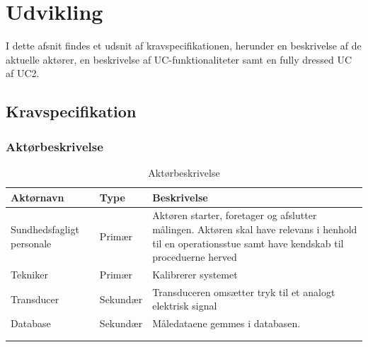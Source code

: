 \chapter{Udvikling}\label{kapitel_Udvikling}

I dette afsnit findes et udsnit af kravspecifikationen, herunder en beskrivelse af de aktuelle aktører, en beskrivelse af UC-funktionaliteter samt en fully dressed UC af UC2.

\section{Kravspecifikation}


\subsection{Aktørbeskrivelse}
\begin{longtabu} to 
    \textbf{Aktørnavn} &        \textbf{Type} &    \textbf{Beskrivelse}\\[-1ex]
    \midrule
    Sundhedsfagligt personale &    Primær &    Aktøren starter, foretager og afslutter målingen. Aktøren skal have relevans i henhold til en operationsstue samt have kendskab til proceduerne herved\\
        Tekniker &       Primær &    Kalibrerer systemet\\
    Transducer &        Sekundær &    Transduceren omsætter tryk til et analogt elektrisk signal\\
    Database &        Sekundær &    Måledataene gemmes i databasen.\\

    
\caption{Aktørbeskrivelse}\\
\label{actortable}
\end{longtabu}

